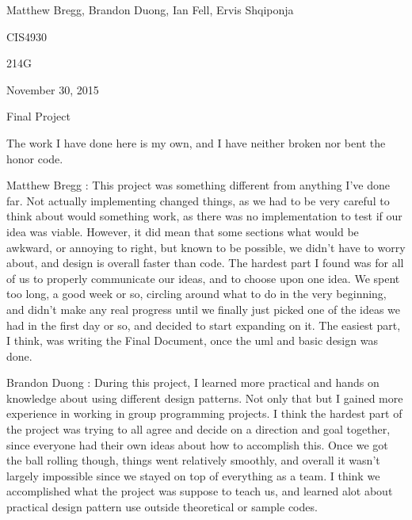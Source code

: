 \documentclass{article}
\begin{document}
\begin{flushright}
Matthew Bregg, Brandon Duong, Ian Fell, Ervis Shqiponja
\end{flushright}
\begin{flushright}
CIS4930
\end{flushright}
\begin{flushright}
214G
\end{flushright}
\begin{flushright}
November 30, 2015
\end{flushright}
\begin{flushright}
Final Project 
\end{flushright}
The work I have done here is my own, and I have neither broken nor bent the honor code.
\newline
\begin{list}{Learning Experience, }{}
\item Matthew Bregg : This project was something different from anything I've done far. Not actually implementing changed things, as we had to be very careful to think about would something work, as there was no implementation to test if our idea was viable. However, it did mean that some sections what would be awkward, or annoying to right, but known to be possible, we didn't have to worry about, and design is overall faster than code. The hardest part I found was for all of us to properly communicate our ideas, and to choose upon one idea. We spent too long, a good week or so, circling around what to do in the very beginning, and didn't make any real progress until we finally just picked one of the ideas we had in the first day or so, and decided to start expanding on it. The easiest part, I think, was writing the Final Document, once the uml and basic design was done. 
\item Brandon Duong : During this project, I learned more practical and hands on knowledge about using different design patterns. Not only that but I gained more experience in working in group programming projects. I think the hardest part of the project was trying to all agree and decide on a direction and goal together, since everyone had their own ideas about how to accomplish this. Once we got the ball rolling though, things went relatively smoothly, and overall it wasn't largely impossible since we stayed on top of everything as a team. I think we accomplished what the project was suppose to teach us, and learned alot about practical design pattern use outside  theoretical or sample codes.

\end{list}
\end{document}

